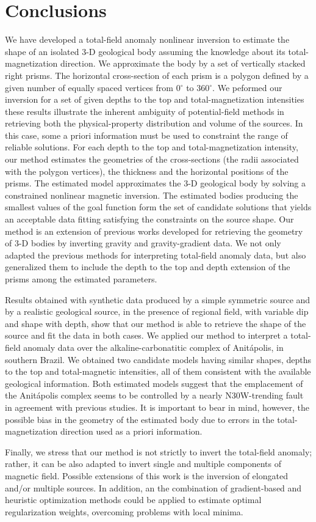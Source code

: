 \section{Conclusions}

We have developed a total-field anomaly nonlinear inversion to estimate the shape 
of an isolated 3-D geological body assuming the knowledge about its 
total-magnetization direction. We approximate the body by a set of vertically 
stacked right prisms. The horizontal cross-section of each prism is a polygon 
defined by a given number of equally spaced vertices from 0$^\circ$ to 360$^\circ$. 
We peformed our inversion for a set of given depths to the top and total-magnetization 
intensities these results illustrate the inherent ambiguity of potential-field methods in 
retrieving both the physical-property distribution and volume of the sources. 
In this case, some a priori information must 
be used to constraint the range of reliable solutions. For each depth to the top and total-magnetization intensity,
our method estimates the geometries of the cross-sections (the radii associated with the polygon vertices), the thickness and 
the horizontal positions of the prisms. The estimated model approximates the 3-D geological body by 
solving a constrained nonlinear magnetic inversion.
The estimated bodies producing the smallest values of the goal function form the 
set of candidate solutions that yields an acceptable data fitting satisfying the 
constraints on the source shape.
Our method is an extension of previous works developed for retrieving the geometry 
of 3-D bodies by inverting gravity and gravity-gradient data. 
We not only adapted the previous methods for interpreting total-field anomaly data,
but also generalized them to include the depth to the top and depth extension of 
the prisms among the estimated parameters.

Results obtained with synthetic data produced by a simple symmetric source 
and by a realistic geological source, in the presence of regional field, 
with variable dip and shape with depth, show that our method is able to retrieve 
the shape of the source and fit the data in both cases.
We applied our method to interpret a total-field anomaly data over the 
alkaline-carbonatitic complex of Anit{\'a}polis, in southern Brazil. 
We obtained two candidate models having similar shapes, depths to the top and 
total-magnetic intensities, all of them consistent with the available 
geological information. 
Both estimated models suggest that the emplacement of the 
Anit{\'a}polis complex seems to be controlled by a nearly N30W-trending fault
in agreement with previous studies.
It is important to bear in mind, however, the possible bias in the geometry of the
estimated body due to errors in the total-magnetization direction used as 
a priori information.

Finally, we stress that our method is not strictly to invert the total-field anomaly; 
rather, it can be also adapted to invert single and multiple components of magnetic field. 
Possible extensions of this work is the inversion of elongated and/or multiple 
sources. 
In addition, an the combination of gradient-based and heuristic optimization 
methods could be applied to estimate optimal regularization weights, 
overcoming problems with local minima.